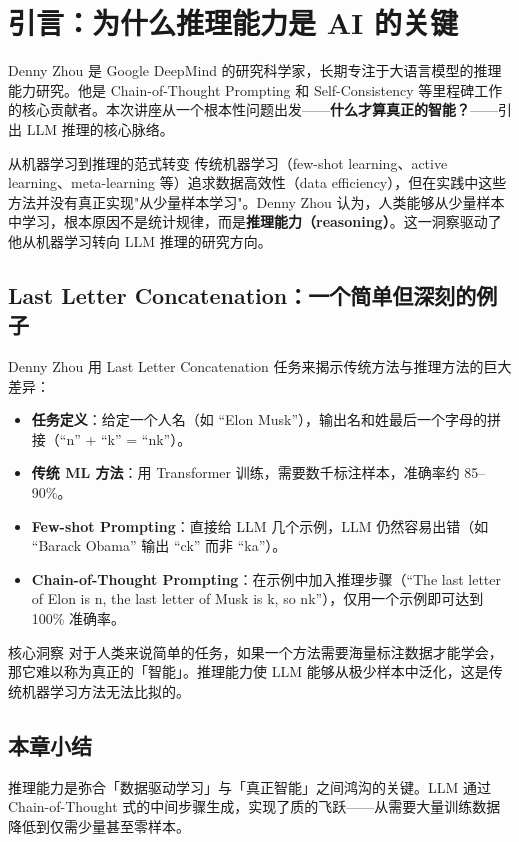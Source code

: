 \section{引言：为什么推理能力是 AI 的关键}

Denny Zhou 是 Google DeepMind 的研究科学家，长期专注于大语言模型的推理能力研究。他是 Chain-of-Thought Prompting 和 Self-Consistency 等里程碑工作的核心贡献者。本次讲座从一个根本性问题出发——\textbf{什么才算真正的智能？}——引出 LLM 推理的核心脉络。

\begin{knowledgebox}{从机器学习到推理的范式转变}
传统机器学习（few-shot learning、active learning、meta-learning 等）追求数据高效性（data efficiency），但在实践中这些方法并没有真正实现"从少量样本学习"。Denny Zhou 认为，人类能够从少量样本中学习，根本原因不是统计规律，而是\textbf{推理能力（reasoning）}。这一洞察驱动了他从机器学习转向 LLM 推理的研究方向。
\end{knowledgebox}

\subsection{Last Letter Concatenation：一个简单但深刻的例子}

Denny Zhou 用 Last Letter Concatenation 任务来揭示传统方法与推理方法的巨大差异：

\begin{itemize}
    \item \textbf{任务定义}：给定一个人名（如 ``Elon Musk''），输出名和姓最后一个字母的拼接（``n'' + ``k'' = ``nk''）。
    \item \textbf{传统 ML 方法}：用 Transformer 训练，需要数千标注样本，准确率约 85--90\%。
    \item \textbf{Few-shot Prompting}：直接给 LLM 几个示例，LLM 仍然容易出错（如 ``Barack Obama'' 输出 ``ck'' 而非 ``ka''）。
    \item \textbf{Chain-of-Thought Prompting}：在示例中加入推理步骤（``The last letter of Elon is n, the last letter of Musk is k, so nk''），仅用一个示例即可达到 100\% 准确率。
\end{itemize}

\begin{importantbox}{核心洞察}
对于人类来说简单的任务，如果一个方法需要海量标注数据才能学会，那它难以称为真正的「智能」。推理能力使 LLM 能够从极少样本中泛化，这是传统机器学习方法无法比拟的。
\end{importantbox}

\subsection{本章小结}

推理能力是弥合「数据驱动学习」与「真正智能」之间鸿沟的关键。LLM 通过 Chain-of-Thought 式的中间步骤生成，实现了质的飞跃——从需要大量训练数据降低到仅需少量甚至零样本。

